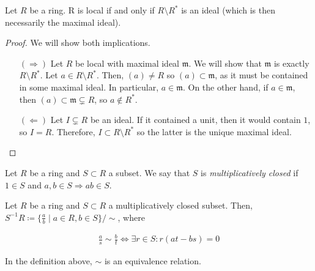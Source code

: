         \begin{prop} \label{prop:local}
            Let $R$ be a ring.
            R is local if and only if $R \setminus R^*$ is an ideal (which is then necessarily the maximal ideal).
        \end{prop}

            \begin{proof}
            We will show both implications.
                \begin{itemize}
                    \item[$(\Rightarrow)$] Let $R$ be local with maximal ideal $\mathfrak{m}$.
                    We will show that $\mathfrak{m}$ is exactly $R \setminus R^*$.
                    Let $a \in R \setminus R^*$.
                    Then, $(a) \neq R$ so $(a) \subset \mathfrak{m}$, as it must be contained in some maximal ideal.
                    In particular, $a \in \mathfrak{m}$.
                    On the other hand,
                    if $a \in \mathfrak{m}$, then $(a) \subset \mathfrak{m} \subsetneq R$, so $a \notin R^*$.

                    \item[$(\Leftarrow)$] Let $I \subsetneq R$ be an ideal.
                    If it contained a unit, then it would contain $1$, so $I = R$.
                    Therefore, $I \subset R \setminus R^*$ so the latter is the unique maximal ideal.
                \end{itemize}
            \end{proof}

        \begin{defn}
            Let $R$ be a ring and $S \subset R$ a subset.
            We say that $S$ is \emph{multiplicatively closed} if $1 \in S$ and $a, b \in S \Rightarrow ab \in S$.
        \end{defn}

        \begin{defn}
            Let $R$ be a ring and $S \subset R$ a multiplicatively closed subset.
            Then, $S^{-1}R \coloneqq \{\frac{a}{b} \mid a \in R, b \in S\}/\sim$,
            where

            \begin{align}
                \frac{a}{s} \sim \frac{b}{t}  \Leftrightarrow \exists r \in S \colon  r (at - bs) = 0
            \end{align}
        \end{defn}

        \begin{prop}
            In the definition above, $\sim$ is an equivalence relation.
        \end{prop}

